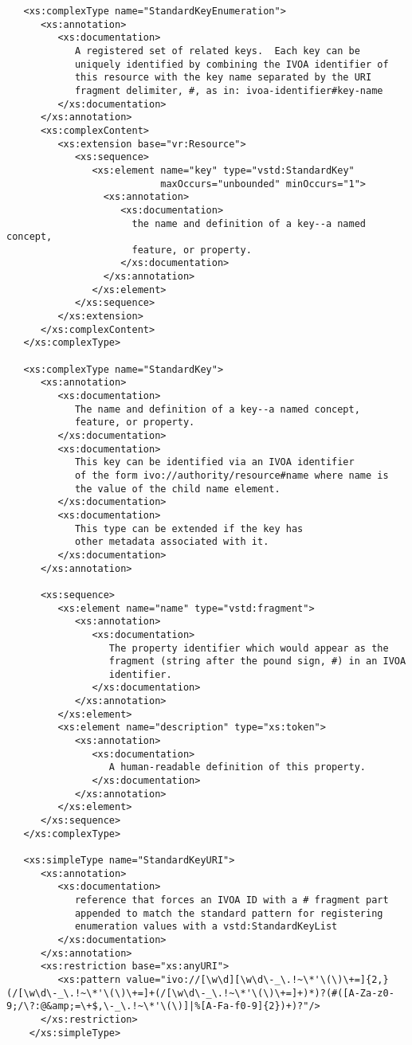 \documentclass[11pt,a4paper]{ivoa}
\begin{document}
{{\begin{verbatim}
   <xs:complexType name="StandardKeyEnumeration">
      <xs:annotation>
         <xs:documentation>
            A registered set of related keys.  Each key can be
            uniquely identified by combining the IVOA identifier of
            this resource with the key name separated by the URI
            fragment delimiter, #, as in: ivoa-identifier#key-name
         </xs:documentation>
      </xs:annotation>
      <xs:complexContent>
         <xs:extension base="vr:Resource">
            <xs:sequence>
               <xs:element name="key" type="vstd:StandardKey"
                           maxOccurs="unbounded" minOccurs="1">
                 <xs:annotation>
                    <xs:documentation>
                      the name and definition of a key--a named concept, 
                      feature, or property.
                    </xs:documentation>
                 </xs:annotation>
               </xs:element>
            </xs:sequence>
         </xs:extension>
      </xs:complexContent>
   </xs:complexType>

   <xs:complexType name="StandardKey">
      <xs:annotation>
         <xs:documentation>
            The name and definition of a key--a named concept, 
            feature, or property.
         </xs:documentation>
         <xs:documentation>
            This key can be identified via an IVOA identifier
            of the form ivo://authority/resource#name where name is
            the value of the child name element.
         </xs:documentation>
         <xs:documentation>
            This type can be extended if the key has
            other metadata associated with it. 
         </xs:documentation>
      </xs:annotation>

      <xs:sequence>
         <xs:element name="name" type="vstd:fragment">
            <xs:annotation>
               <xs:documentation>
                  The property identifier which would appear as the
                  fragment (string after the pound sign, #) in an IVOA
                  identifier.  
               </xs:documentation>
            </xs:annotation>
         </xs:element>
         <xs:element name="description" type="xs:token">
            <xs:annotation>
               <xs:documentation>
                  A human-readable definition of this property.  
               </xs:documentation>
            </xs:annotation>
         </xs:element>
      </xs:sequence>
   </xs:complexType>

   <xs:simpleType name="StandardKeyURI">
      <xs:annotation>
         <xs:documentation>
            reference that forces an IVOA ID with a # fragment part
            appended to match the standard pattern for registering
            enumeration values with a vstd:StandardKeyList
         </xs:documentation>
      </xs:annotation>
      <xs:restriction base="xs:anyURI">
         <xs:pattern value="ivo://[\w\d][\w\d\-_\.!~\*'\(\)\+=]{2,}(/[\w\d\-_\.!~\*'\(\)\+=]+(/[\w\d\-_\.!~\*'\(\)\+=]+)*)?(#([A-Za-z0-9;/\?:@&amp;=\+$,\-_\.!~\*'\(\)]|%[A-Fa-f0-9]{2})+)?"/>
      </xs:restriction>
    </xs:simpleType>


\end{verbatim}}}
\end{document}
